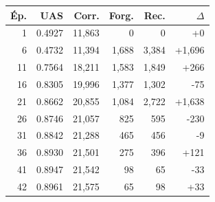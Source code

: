 \begin{table}[ht]
\hfill
\begin{minipage}[t]{0.42\linewidth}
\centering\tiny
\begin{tabular}{rrrrrr}
\toprule
\textbf{Ép.} & \textbf{UAS} & \textbf{Corr.} & \textbf{Forg.} & \textbf{Rec.} & \textbf{$\Delta$} \\
\midrule
1 & 0.4927 & 11,863 & 0 & 0 & +0 \\
6 & 0.4732 & 11,394 & 1,688 & 3,384 & +1,696 \\
11 & 0.7564 & 18,211 & 1,583 & 1,849 & +266 \\
16 & 0.8305 & 19,996 & 1,377 & 1,302 & -75 \\
21 & 0.8662 & 20,855 & 1,084 & 2,722 & +1,638 \\
26 & 0.8746 & 21,057 & 825 & 595 & -230 \\
31 & 0.8842 & 21,288 & 465 & 456 & -9 \\
36 & 0.8930 & 21,501 & 275 & 396 & +121 \\
41 & 0.8947 & 21,542 & 98 & 65 & -33 \\
42 & 0.8961 & 21,575 & 65 & 98 & +33 \\
\bottomrule
\end{tabular}
\end{minipage}
\end{table}
